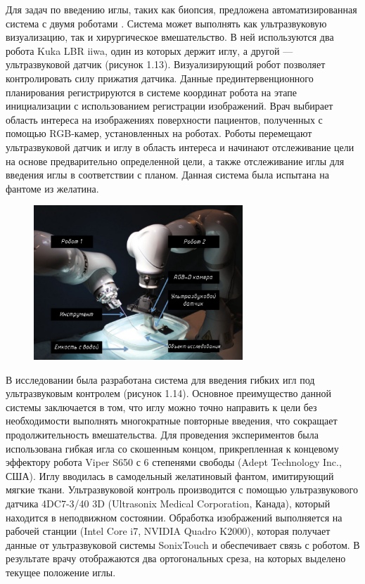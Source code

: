 Для задач по введению иглы, таких как биопсия, предложена автоматизированная система с двумя роботами \cite{litlink35}. Система может выполнять как ультразвуковую визуализацию, так и хирургическое вмешательство. В ней используются два робота Kuka LBR iiwa, один из которых держит иглу, а другой — ультразвуковой датчик (рисунок 1.13). Визуализирующий робот позволяет контролировать силу прижатия датчика. Данные прединтервенционного планирования регистрируются в системе координат робота на этапе инициализации с использованием регистрации изображений. Врач выбирает область интереса на изображениях поверхности пациентов, полученных с помощью RGB-камер, установленных на роботах. Роботы перемещают ультразвуковой датчик и иглу в область интереса и начинают отслеживание цели на основе предварительно определенной цели, а также отслеживание иглы для введения иглы в соответствии с планом. Данная система была испытана на фантоме из желатина.

\begin{figure}[!h]
\begin{center}
\includegraphics[width=0.7\textwidth]{Рисунки/аналог1.png}
\caption{\centering {}}
\label{част}
\end{center}
\end{figure}
\newpage

В исследовании \cite{litlink41} была разработана система для введения гибких игл под ультразвуковым контролем (рисунок 1.14). Основное преимущество данной системы заключается в том, что иглу можно точно направить к цели без необходимости выполнять многократные повторные введения, что сокращает продолжительность вмешательства. Для проведения экспериментов была использована гибкая игла со скошенным концом, прикрепленная к концевому эффектору робота Viper S650 с 6 степенями свободы (Adept Technology Inc., США). Иглу вводилась в самодельный желатиновый фантом, имитирующий мягкие ткани. Ультразвуковой контроль производится с помощью ультразвукового датчика 4DC7-3/40 3D (Ultrasonix Medical Corporation, Канада), который находится в неподвижном состоянии.   Обработка изображений выполняется на рабочей станции (Intel Core i7, NVIDIA Quadro K2000), которая получает данные от ультразвуковой системы SonixTouch и обеспечивает связь с роботом. В результате врачу отображаются два ортогональных среза, на которых выделено текущее положение иглы.

